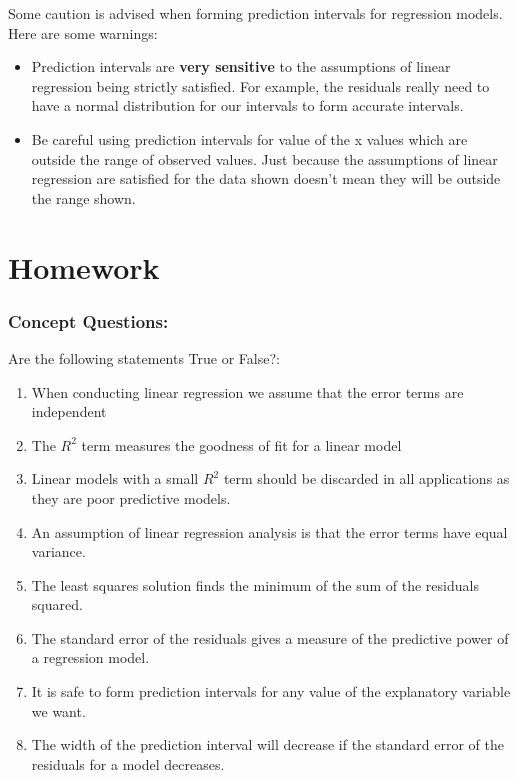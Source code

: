 \documentclass[
]{book}
\theoremstyle{definition}
\theoremstyle{definition}
\theoremstyle{definition}
\theoremstyle{definition}
\theoremstyle{remark}
\begin{document}
Some caution is advised when forming prediction intervals for regression models. Here are some warnings:

\begin{itemize}
\item
  Prediction intervals are \textbf{very sensitive} to the assumptions of linear regression being strictly satisfied. For example, the residuals really need to have a normal distribution for our intervals to form accurate intervals.
\item
  Be careful using prediction intervals for value of the x values which are outside the range of observed values. Just because the assumptions of linear regression are satisfied for the data shown doesn't mean they will be outside the range shown.
\end{itemize}

\hypertarget{homework-9}{%
\section{Homework}\label{homework-9}}

\hypertarget{concept-questions-8}{%
\subsubsection{Concept Questions:}\label{concept-questions-8}}

Are the following statements True or False?:

\begin{enumerate}
\def\labelenumi{\arabic{enumi}.}
\item
  When conducting linear regression we assume that the error terms are independent
\item
  The \(R^2\) term measures the goodness of fit for a linear model
\item
  Linear models with a small \(R^2\) term should be discarded in all applications as they are poor predictive models.
\item
  An assumption of linear regression analysis is that the error terms have equal variance.
\item
  The least squares solution finds the minimum of the sum of the residuals squared.
\item
  The standard error of the residuals gives a measure of the predictive power of a regression model.
\item
  It is safe to form prediction intervals for any value of the explanatory variable we want.
\item
  The width of the prediction interval will decrease if the standard error of the residuals for a model decreases.
\end{enumerate}
\end{document}
